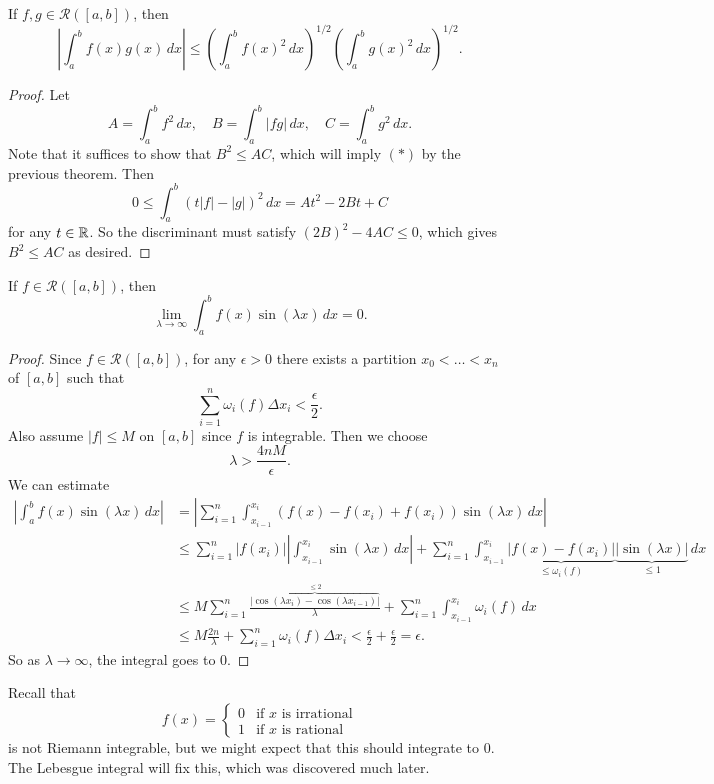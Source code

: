 \begin{example}
  If $f, g \in \mathcal{R}([a, b])$, then
  \[
    \left| \int_a^b f(x) g(x) \, dx \right|
    \le \left( \int_a^b f(x)^2 \, dx \right)^{1/2}
    \left( \int_a^b g(x)^2 \, dx \right)^{1/2}. \tag{$*$}
  \]
\end{example}

\begin{proof}
  Let
  \[
    A = \int_a^b f^2 \, dx, \quad
    B = \int_a^b |fg| \, dx,\quad
    C = \int_a^b g^2 \, dx.
  \]
  Note that it suffices to
  show that $B^2 \le AC$, which will imply $(*)$
  by the previous theorem. Then
  \[
    0 \le \int_a^b (t|f| - |g|)^2\, dx
    = A t^2 - 2Bt + C
  \]
  for any $t \in \mathbb{R}$. So the discriminant must satisfy
  $(2B)^2 - 4AC \le 0$, which gives $B^2 \le AC$
  as desired.
\end{proof}

\begin{example}
  If $f \in \mathcal{R}([a, b])$, then
  \[
    \lim_{\lambda \to \infty} \int_a^b f(x) \sin(\lambda x) \, dx = 0.
  \]
\end{example}

\begin{proof}
  Since $f \in \mathcal{R}([a, b])$, for any
  $\epsilon > 0$ there exists a partition
  $x_0 < \dots < x_n$ of $[a, b]$ such that
  \[
    \sum_{i = 1}^n \omega_i(f) \Delta x_i < \frac{\epsilon}{2}.
  \]
  Also assume $|f| \le M$ on $[a, b]$ since $f$ is
  integrable. Then we choose
  \[
    \lambda > \frac{4nM}{\epsilon}.
  \]
  We can estimate
  \begin{align*}
    \left| \int_a^b f(x) \sin(\lambda x) \, dx \right|
    &= \left|\sum_{i = 1}^n \int_{x_{i - 1}}^{x_i} (f(x) - f(x_{i}) + f(x_i)) \sin(\lambda x)\, dx\right| \\
    &\le
    \sum_{i = 1}^n |f(x_i)| \left|\int_{x_{i - 1}}^{x_i} \sin(\lambda x)\, dx\right|
    + \sum_{i = 1}^n \int_{x_{i - 1}}^{x_i} \underbrace{|f(x) - f(x_i)|}_{\le \omega_i(f)} \underbrace{|\sin(\lambda x)|}_{\le 1}\, dx \\
    &\le
    M \sum_{i = 1}^n \frac{\overbrace{|\cos(\lambda x_{i}) - \cos(\lambda x_{i - 1})|}^{\le 2}}{\lambda}
    + \sum_{i = 1}^n \int_{x_{i - 1}}^{x_i} \omega_i(f)\, dx \\
    &\le M \frac{2n}{\lambda} + \sum_{i = 1}^n \omega_i(f) \Delta x_i < \frac{\epsilon}{2} + \frac{\epsilon}{2} = \epsilon.
  \end{align*}
  So as $\lambda \to \infty$, the integral goes to $0$.
\end{proof}

\begin{remark}
  Recall that
  \[
    f(x) =
    \begin{cases}
      0 & \text{if } x \text{ is irrational} \\
      1 & \text{if } x \text{ is rational}
    \end{cases}
  \]
  is not Riemann integrable, but we might expect that
  this
  should integrate to $0$. The Lebesgue integral
  will fix this, which was discovered much later.
\end{remark}
